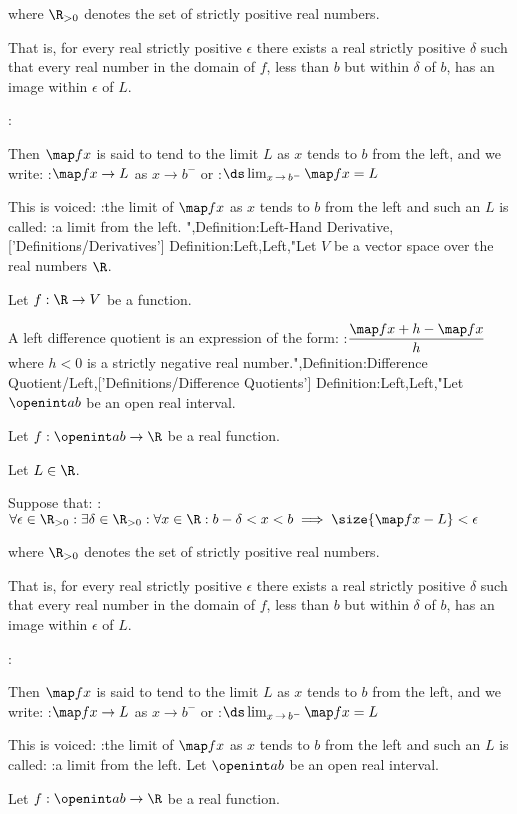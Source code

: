 where $\R_{>0}$ denotes the set of strictly positive real numbers.

That is, for every real strictly positive $\epsilon$ there exists a real strictly positive $\delta$ such that every real number in the domain of $f$, less than $b$ but within $\delta$ of $b$, has an image within $\epsilon$ of $L$.


:

Then $\map f x$ is said to tend to the limit $L$ as $x$ tends to $b$ from the left, and we write:
:$\map f x \to L$ as $x \to b^-$
or
:$\ds \lim_{x \mathop \to b^-} \map f x = L$


This is voiced:
:the limit of $\map f x$ as $x$ tends to $b$ from the left
and such an $L$ is called:
:a limit from the left.
",Definition:Left-Hand Derivative,['Definitions/Derivatives']
Definition:Left,Left,"Let $V$ be a vector space over the real numbers $\R$.

Let $f: \R \to V$ be a function.


A left difference quotient is an expression of the form:
:$\dfrac {\map f {x + h} - \map f x} h$
where $h < 0$ is a strictly negative real number.",Definition:Difference Quotient/Left,['Definitions/Difference Quotients']
Definition:Left,Left,"Let $\openint a b$ be an open real interval.

Let $f: \openint a b \to \R$ be a real function.

Let $L \in \R$.


Suppose that:
:$\forall \epsilon \in \R_{>0}: \exists \delta \in \R_{>0}: \forall x \in \R: b - \delta < x < b \implies \size {\map f x - L} < \epsilon$

where $\R_{>0}$ denotes the set of strictly positive real numbers.

That is, for every real strictly positive $\epsilon$ there exists a real strictly positive $\delta$ such that every real number in the domain of $f$, less than $b$ but within $\delta$ of $b$, has an image within $\epsilon$ of $L$.


:

Then $\map f x$ is said to tend to the limit $L$ as $x$ tends to $b$ from the left, and we write:
:$\map f x \to L$ as $x \to b^-$
or
:$\ds \lim_{x \mathop \to b^-} \map f x = L$


This is voiced:
:the limit of $\map f x$ as $x$ tends to $b$ from the left
and such an $L$ is called:
:a limit from the left.
Let $\openint a b$ be an open real interval.

Let $f: \openint a b \to \R$ be a real function.

